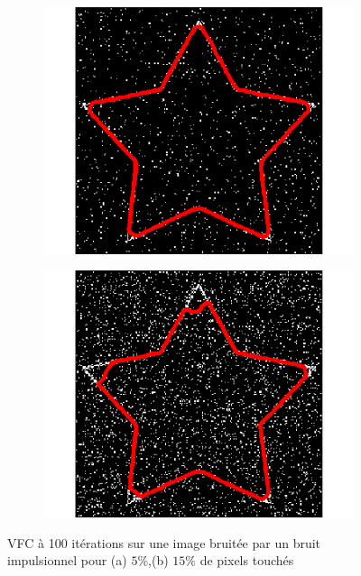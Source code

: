 \begin{appendices}
\begin{figure}[H]
\centering
\begin{subfigure}[c]{0.3\linewidth}
\centering
\includegraphics[width=\textwidth]{Chapters/Images/Noise/vfcimp5}
\caption{}
\end{subfigure}
\begin{subfigure}[c]{0.3\linewidth}
\centering
\includegraphics[width=\textwidth]{Chapters/Images/Noise/vfcimp15}
\caption{}
\end{subfigure}
\caption{VFC à 100 itérations sur une image bruitée par un bruit impulsionnel pour (a) $5\%$,(b) $15\%$ de pixels touchés}
\end{figure}


\end{appendices}
